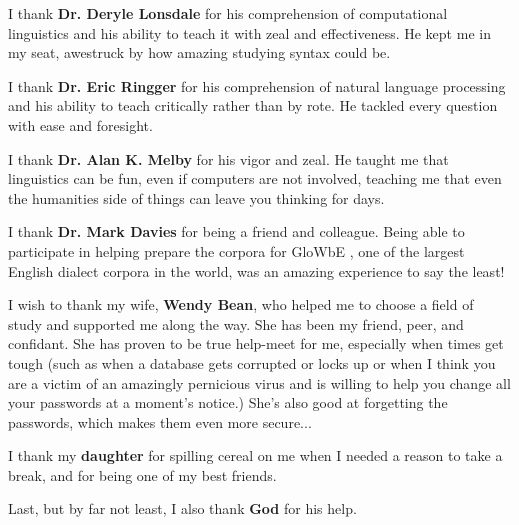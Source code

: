 I thank \textbf{Dr. Deryle Lonsdale} for his comprehension of computational linguistics and his ability to teach it with zeal and effectiveness. He kept me in my seat, awestruck by how amazing studying syntax could be.\bigskip \medskip

I thank \textbf{Dr. Eric Ringger} for his comprehension of natural language processing and his ability to teach critically rather than by rote. He tackled every question with ease and foresight.\bigskip \medskip

I thank \textbf{Dr. Alan K. Melby} for his vigor and zeal. He taught me that linguistics can be fun, even if computers are not involved, teaching me that even the humanities side of things can leave you thinking for days.\bigskip \medskip %

I thank \textbf{Dr. Mark Davies} for being a friend and colleague. Being able to participate in helping prepare the corpora for GloWbE \citep{glowbe}, one of the largest English dialect corpora in the world, was an amazing experience to say the least!\bigskip \medskip %


I wish to thank my wife, \textbf{Wendy Bean}, who helped me to choose a field of study and supported me along the way. %
She has been my friend, peer, and confidant. She has proven to be true help-meet for me, especially when times get tough (such as when a database gets corrupted or locks up or when I think you are a victim of an amazingly pernicious virus and is willing to help you change all your passwords at a moment's notice.) She's also good at forgetting the passwords, which makes them even more secure...\bigskip \medskip

I thank my \textbf{daughter} for spilling cereal on me when I needed a reason to take a break, and for being one of my best friends.%

Last, but by far not least, I also thank \textbf{God} for his help.\bigskip \medskip

